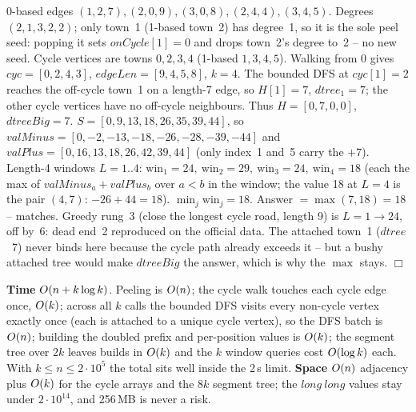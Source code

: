 \begin{tracebox}[Sample 2: \(n{=}5\) -- peel isolates a 4-cycle, one attached leaf at town 3]
0-based edges \((1,2,7),(2,0,9),(3,0,8),(2,4,4),(3,4,5)\).  Degrees \((2,1,3,2,2)\);
only town~1 (1-based town~2) has degree~1, so it is the sole peel seed: popping it
sets \(\mathit{onCycle}[1]{=}0\) and drops town~2's degree to~2 -- no new seed.  Cycle
vertices are towns \(0,2,3,4\) (1-based \(1,3,4,5\)).  Walking from 0 gives
\(\mathit{cyc}{=}[0,2,4,3]\), \(\mathit{edgeLen}{=}[9,4,5,8]\), \(k{=}4\).  The bounded DFS at
\(\mathit{cyc}[1]{=}2\) reaches the off-cycle town~1 on a length-7 edge, so \(H[1]{=}7\),
\(\mathit{dtree}_1{=}7\); the other cycle vertices have no off-cycle neighbours.
Thus \(H{=}[0,7,0,0]\), \(\mathit{dtreeBig}{=}7\).
\(S=[0,9,13,18,26,35,39,44]\), so \(\mathit{valMinus}=[0,-2,-13,-18,-26,-28,-39,-44]\) and
\(\mathit{valPlus}=[0,16,13,18,26,42,39,44]\) (only index~1 and~5 carry the \(+7\)).
Length-4 windows \(L{=}1..4\): \(\mathrm{win}_1{=}24,\ \mathrm{win}_2{=}29,\ \mathrm{win}_3{=}24,\ \mathrm{win}_4{=}18\)
(each the max of \(\mathit{valMinus}_a{+}\mathit{valPlus}_b\) over \(a<b\) in the window; the
value 18 at \(L{=}4\) is the pair \((4,7)\): \(-26{+}44=18\)).
\(\min_j\mathrm{win}_j=18\).  Answer \(=\max(7,18)=\boxed{18}\) -- matches.  Greedy
rung~3 (close the longest cycle road, length 9) is \(L{=}1\to 24\), off by~6: dead
end~2 reproduced on the official data.  The attached town~1 (\(\mathit{dtree}\)~7) never
binds here because the cycle path already exceeds it -- but a bushy attached tree
would make \(\mathit{dtreeBig}\) the answer, which is why the \(\max\) stays. \(\Box\)
\end{tracebox}

\begin{complexitybox}
\textbf{Time} \(O(n + k\log k)\).  Peeling is \(O(n)\); the cycle walk touches
each cycle edge once, \(O(k)\); across all \(k\) calls the bounded DFS visits every
non-cycle vertex exactly once (each is attached to a unique cycle vertex), so the
DFS batch is \(O(n)\); building the doubled prefix and per-position values is
\(O(k)\); the segment tree over \(2k\) leaves builds in \(O(k)\) and the \(k\) window
queries cost \(O(\log k)\) each.  With \(k\le n\le 2\cdot 10^{5}\) the total sits
well inside the 2\,s limit.  \textbf{Space} \(O(n)\) adjacency plus \(O(k)\) for the
cycle arrays and the \(8k\) segment tree; the \(\mathit{long\ long}\) values stay under
\(2\cdot 10^{14}\), and 256\,MB is never a risk.
\end{complexitybox}

